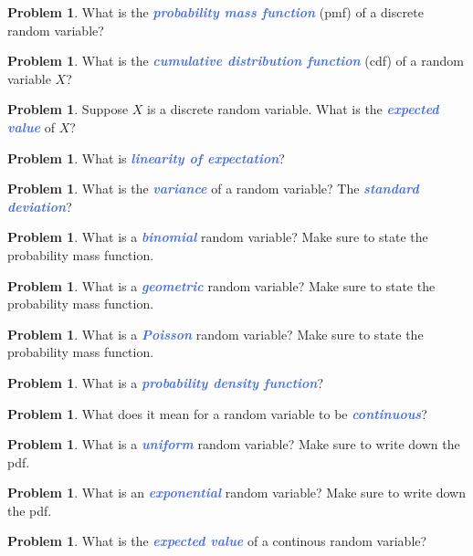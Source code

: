 \documentclass[10pt]{article}
\newcommand{\demph}[1]{\textcolor{RoyalBlue}{\textbf{\slshape #1}}} %
\theoremstyle{definition}
\newtheorem{problem}[theorem]{Problem}
\begin{document}
\begin{problem}
  What is the \demph{probability mass function} (pmf) of a discrete random variable?
\end{problem}

\begin{problem}
  What is the \demph{cumulative distribution function} (cdf) of a random variable $X$?
\end{problem}



\begin{problem}
  Suppose $X$ is a discrete random variable. What is the \demph{expected
    value} of $X$?
\end{problem}


\begin{problem}
  What is \demph{linearity of expectation}?
\end{problem}


\begin{problem}
  What is the \demph{variance} of a random variable? The \demph{standard deviation}?
\end{problem}


\begin{problem}
  What is a \demph{binomial} random variable? Make sure to state the probability
  mass function.
\end{problem}


\begin{problem}
  What is a \demph{geometric} random variable? Make sure to state the
  probability mass function.
\end{problem}


\begin{problem}
  What is a \demph{Poisson} random variable? Make sure to state the
  probability mass function.
\end{problem}

\begin{problem}
  What is a \demph{probability density function}?
\end{problem}

\begin{problem}
  What does it mean for a random variable to be \demph{continuous}?
\end{problem}

\begin{problem}
  What is a \demph{uniform} random variable? Make sure to write down the
  pdf.
\end{problem}

\begin{problem}
  What is an \demph{exponential} random variable? Make sure to write down the
  pdf.
\end{problem}

\begin{problem}
  What is the \demph{expected value} of a continous random variable?
\end{problem}
\end{document}

